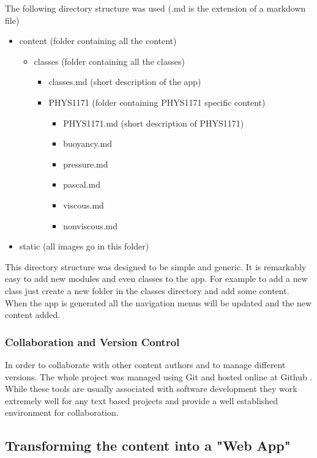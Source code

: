 \documentclass[12pt,a4paper]{article}  %
\begin{document}
The following directory structure was used (.md is the extension of a markdown file)
\begin{itemize}
\item content (folder containing all the content)
\begin{itemize}
\item classes (folder containing all the classes)
\begin{itemize}
\item classes.md (short description of the app)
\item PHYS1171 (folder containing PHYS1171 specific content)
\begin{itemize}
\item PHYS1171.md (short description of PHYS1171)
\item buoyancy.md
\item pressure.md
\item pascal.md
\item viscous.md
\item nonviscous.md
\end{itemize}
\end{itemize}
\end{itemize}
\item static (all images go in this folder)
\end{itemize}

This directory structure was designed to be simple and generic. It is remarkably easy to add new modules and even classes to the app. For example to add a new class just create a new folder in the classes directory and add some content. When the app is generated all the navigation menus will be updated and the new content added.

\subsubsection{Collaboration and Version Control}

In order to collaborate with other content authors and to manage different versions. The whole project was managed using Git \cite{git} and hosted online at Github \cite{github}. While these tools are usually associated with software development they work extremely well for any text based projects and provide a well established environment for collaboration. 

\subsection{Transforming the content into a "Web App"}
\end{document}
